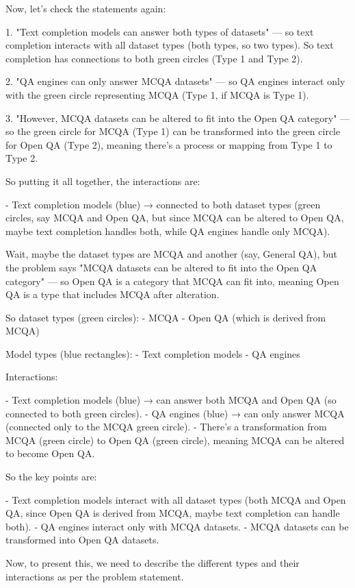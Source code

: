 Now, let's check the statements again:

1. "Text completion models can answer both types of datasets" — so text completion interacts with all dataset types (both types, so two types). So text completion has connections to both green circles (Type 1 and Type 2).

2. "QA engines can only answer MCQA datasets" — so QA engines interact only with the green circle representing MCQA (Type 1, if MCQA is Type 1).

3. "However, MCQA datasets can be altered to fit into the Open QA category" — so the green circle for MCQA (Type 1) can be transformed into the green circle for Open QA (Type 2), meaning there's a process or mapping from Type 1 to Type 2.

So putting it all together, the interactions are:

- Text completion models (blue) → connected to both dataset types (green circles, say MCQA and Open QA, but since MCQA can be altered to Open QA, maybe text completion handles both, while QA engines handle only MCQA).

Wait, maybe the dataset types are MCQA and another (say, General QA), but the problem says "MCQA datasets can be altered to fit into the Open QA category" — so Open QA is a category that MCQA can fit into, meaning Open QA is a type that includes MCQA after alteration.

So dataset types (green circles):
- MCQA
- Open QA (which is derived from MCQA)

Model types (blue rectangles):
- Text completion models
- QA engines

Interactions:

- Text completion models (blue) → can answer both MCQA and Open QA (so connected to both green circles).
- QA engines (blue) → can only answer MCQA (connected only to the MCQA green circle).
- There's a transformation from MCQA (green circle) to Open QA (green circle), meaning MCQA can be altered to become Open QA.

So the key points are:

- Text completion models interact with all dataset types (both MCQA and Open QA, since Open QA is derived from MCQA, maybe text completion can handle both).
- QA engines interact only with MCQA datasets.
- MCQA datasets can be transformed into Open QA datasets.

Now, to present this, we need to describe the different types and their interactions as per the problem statement.

